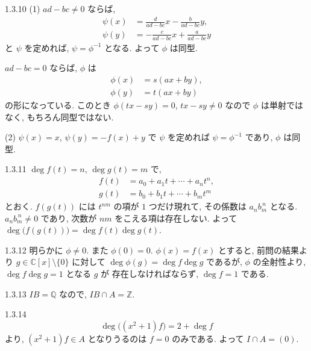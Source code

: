 \begin{ans}{1.3.10}
  (1) $ad - bc \neq 0$ ならば,
  \begin{align*}
    \psi(x) &= \frac{d}{ad - bc}x - \frac{b}{ad - bc}y, \\
    \psi(y) &= -\frac{c}{ad - bc}x + \frac{a}{ad - bc}y
  \end{align*}
  と $\psi$ を定めれば, $\psi = \phi^{-1}$ となる. よって $\phi$ は同型.

  $ad - bc = 0$ ならば, $\phi$ は
  \begin{align*}
    \phi(x) &= s(ax + by), \\
    \phi(y) &= t(ax + by)
  \end{align*}
  の形になっている. このとき $\phi(tx - sy) = 0$, $tx - sy \neq 0$ なので $\phi$ は単射ではなく,
  もちろん同型ではない.

  \medskip
  (2) $\psi(x) = x$, $\psi(y) = -f(x) + y$ で $\psi$ を定めれば $\psi = \phi^{-1}$ であり, $\phi$ は同型.
\end{ans}

\begin{ans}{1.3.11}
  $\deg f(t) = n$, $\deg g(t) = m$ で,
  \begin{align*}
    f(t) &= a_0 + a_1 t + \cdots + a_n t^n, \\
    g(t) &= b_0 + b_1 t + \cdots + b_m t^m
  \end{align*}
  とおく. $f(g(t))$ には $t^{nm}$ の項が $1$ つだけ現れて, その係数は $a_n b_m^{\,n}$ となる.
  $a_n b_m^{\,n} \neq 0$ であり, 次数が $nm$ をこえる項は存在しない.
  よって $\deg\bigl(f(g(t))\bigr) = \deg f(t) \deg g(t)$.
\end{ans}

\begin{ans}{1.3.12}
  明らかに $\phi \neq 0$. また $\phi(0) = 0$.
  $\phi(x) = f(x)$ とすると, 前問の結果より $g \in \mathbb{C}[x] \setminus \{0\}$ に対して
  $\deg \phi(g) = \deg f \deg g$ であるが, $\phi$ の全射性より, $\deg f \deg g = 1$ となる $g$ が
  存在しなければならず, $\deg f = 1$ である.
\end{ans}

\begin{ans}{1.3.13}
  $IB = \mathbb{Q}$ なので, $IB \cap A = \mathbb{Z}$.
\end{ans}

\begin{ans}{1.3.14}
  \[
    \deg\bigl((x^2 + 1)f\bigr) = 2 + \deg f
  \]
  より, $(x^2 + 1)f \in A$ となりうるのは $f = 0$ のみである.
  よって $I \cap A = (0)$.
\end{ans}

